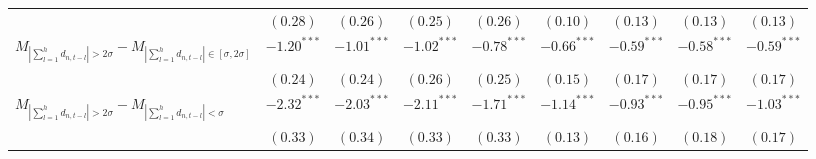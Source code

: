 \begin{tabular}{lcccccccc}
   & $(0.28)$ & $(0.26)$ & $(0.25)$ & $(0.26)$ & $(0.10)$ & $(0.13)$ & $(0.13)$ & $(0.13)$ \\ 
  $M_{\left|\sum_{l=1}^h d_{n,t-l}\right| > 2 \sigma}-M_{\left|\sum_{l=1}^h d_{n,t-l}\right| \in [\sigma, 2\sigma]}$ & $-1.20^{***}$ & $-1.01^{***}$ & $-1.02^{***}$ & $-0.78^{***}$ & $-0.66^{***}$ & $-0.59^{***}$ & $-0.58^{***}$ & $-0.59^{***}$ \\ 
   & $(0.24)$ & $(0.24)$ & $(0.26)$ & $(0.25)$ & $(0.15)$ & $(0.17)$ & $(0.17)$ & $(0.17)$ \\ 
  $M_{\left|\sum_{l=1}^h d_{n,t-l}\right| > 2 \sigma}-M_{\left|\sum_{l=1}^h d_{n,t-l}\right| < \sigma}$ & $-2.32^{***}$ & $-2.03^{***}$ & $-2.11^{***}$ & $-1.71^{***}$ & $-1.14^{***}$ & $-0.93^{***}$ & $-0.95^{***}$ & $-1.03^{***}$ \\ 
   & $(0.33)$ & $(0.34)$ & $(0.33)$ & $(0.33)$ & $(0.13)$ & $(0.16)$ & $(0.18)$ & $(0.17)$ \\ 
   \hline 
\end{tabular}
